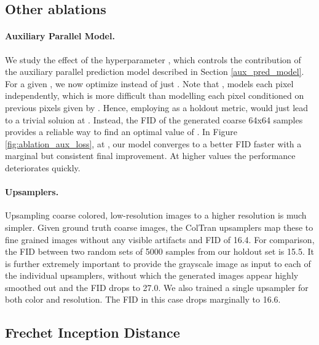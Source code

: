\documentclass{article} \usepackage{iclr2021_conference,times}
\begin{document}
\subsection{Other ablations}
\label{other_ablations}

\paragraph{Auxiliary Parallel Model.} We study the effect of the hyperparameter , which controls the contribution of the auxiliary parallel prediction model described in Section \ref{aux_pred_model}. For a given , we now optimize  instead of just . Note that , models each pixel independently, which is more difficult than modelling each pixel conditioned on previous pixels given by . Hence, employing  as a holdout metric, would just lead to a trivial soluion at . Instead, the FID of the generated coarse 64x64 samples provides a reliable way to find an optimal value of . In Figure \ref{fig:ablation_aux_loss}, at , our model converges to a better FID faster with a marginal but consistent final improvement. At higher values the performance deteriorates quickly.

\paragraph{Upsamplers.} Upsampling coarse colored, low-resolution images to a higher resolution is much simpler. Given ground truth  coarse images, the ColTran upsamplers map these to fine grained  images without any visible artifacts and FID of 16.4. For comparison, the FID between two random sets of 5000 samples from our holdout set is 15.5. It is further extremely important to provide the grayscale image as input to each of the individual upsamplers, without which the generated images appear highly smoothed out and the FID drops to 27.0. We also trained a single upsampler for both color and resolution. The FID in this case drops marginally to 16.6.



\subsection{Frechet Inception Distance}
\label{comparison_expts}
\end{document}
